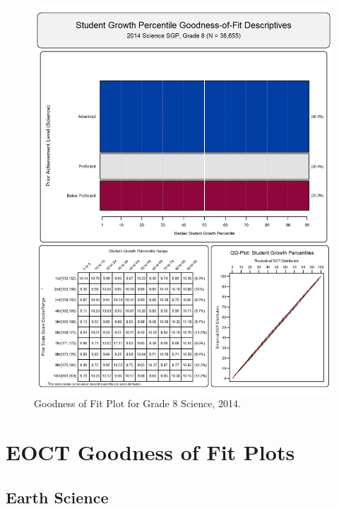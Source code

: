 \documentclass[12pt]{article}
\begin{document}
\begin{figure}[htbp]
\centering
\includegraphics{../img/Goodness_of_Fit/SCIENCE.2014/2014_SCIENCE_8;2013_SCIENCE_7;2012_SCIENCE_6;2011_SCIENCE_5;2010_SCIENCE_4.png}
\caption{Goodness of Fit Plot for Grade 8 Science, 2014.}
\end{figure}

\section{EOCT Goodness of Fit Plots}\label{eoct-goodness-of-fit-plots}

\subsection{Earth Science}\label{earth-science}
\end{document}
